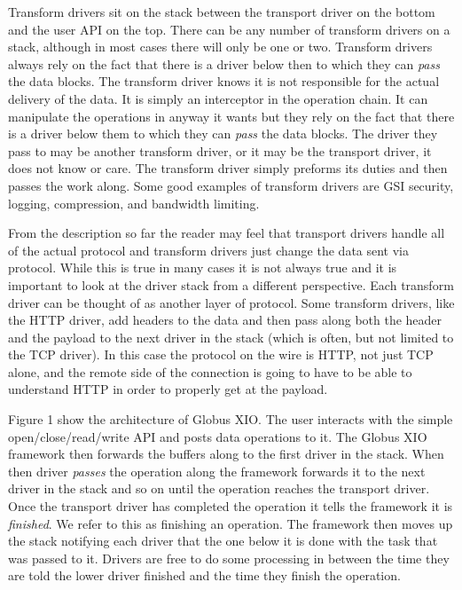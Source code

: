\documentclass[11pt]{article}
\begin{document}
Transform drivers sit on the stack between the transport driver on the
bottom and the user API on the top.  There can be any number of transform
drivers on a stack, although in most cases there will only be one or 
two.  Transform drivers always rely on the fact that there is a driver
below then to which they can \emph{pass} the data blocks.  The transform
driver knows it is not responsible for the actual delivery of the data.
It is simply an interceptor in the operation chain.  It can manipulate
the operations in anyway it wants but they rely on the fact that there is
a driver below them to which they can \emph{pass} the data blocks.  The 
driver they pass to may be another transform driver, or it may be the
transport driver, it does not know or care.  The transform driver simply
preforms its duties and then passes the work along.  Some good examples
of transform drivers are GSI security, logging, compression, 
and bandwidth limiting.

From the description so far the reader may feel that transport drivers
handle all of the actual protocol and transform drivers just change the
data sent via protocol.  While this is true in many cases
it is not always true and it is important to look at the driver
stack from a different perspective.  Each transform driver can be 
thought of as another layer of protocol.  Some transform drivers, like the
HTTP driver, add headers to the data and then pass along both the
header and the payload to the next driver in the stack (which is often,
but not limited to the TCP driver).  In this case the protocol on the
wire is HTTP, not just TCP alone, and the remote side of the connection is
going to have to be able to understand HTTP in order to properly get
at the payload.

Figure 1 show the architecture of Globus XIO.  The user interacts with 
the simple open/close/read/write API and posts data operations to it.
The Globus XIO framework then forwards the buffers along to the first
driver in the stack.  When then driver \emph{passes} the operation along
the framework forwards it to the next driver in the stack and so on
until the operation reaches the transport driver.  Once the transport 
driver has completed the operation it tells the framework it is 
\emph{finished}.  We refer to this as finishing an operation.  The 
framework then moves up the stack notifying each driver that the 
one below it is done with the task that was passed to it.  Drivers
are free to do some processing in between the time they are told
the lower driver finished and the time they finish the operation.
\end{document}
